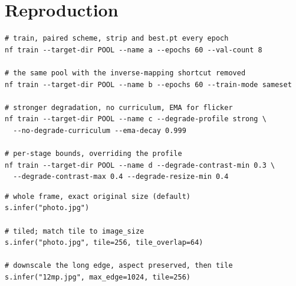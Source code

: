 \documentclass[11pt,a4paper]{article}
\begin{document}
\appendix
\section{Reproduction}

\begin{lstlisting}
# train, paired scheme, strip and best.pt every epoch
nf train --target-dir POOL --name a --epochs 60 --val-count 8

# the same pool with the inverse-mapping shortcut removed
nf train --target-dir POOL --name b --epochs 60 --train-mode sameset

# stronger degradation, no curriculum, EMA for flicker
nf train --target-dir POOL --name c --degrade-profile strong \
  --no-degrade-curriculum --ema-decay 0.999

# per-stage bounds, overriding the profile
nf train --target-dir POOL --name d --degrade-contrast-min 0.3 \
  --degrade-contrast-max 0.4 --degrade-resize-min 0.4
\end{lstlisting}

\begin{lstlisting}
# whole frame, exact original size (default)
s.infer("photo.jpg")

# tiled; match tile to image_size
s.infer("photo.jpg", tile=256, tile_overlap=64)

# downscale the long edge, aspect preserved, then tile
s.infer("12mp.jpg", max_edge=1024, tile=256)
\end{lstlisting}
\end{document}
